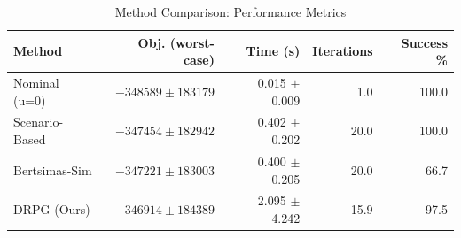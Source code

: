 \begin{table}[t]
\centering
\caption{Method Comparison: Performance Metrics}
\label{tab:method_comparison}
\begin{tabular}{lrrrr}
\toprule
\textbf{Method} & \textbf{Obj. (worst-case)} & \textbf{Time (s)} & \textbf{Iterations} & \textbf{Success \%} \\
\midrule
Nominal (u=0)        & $-348589 \pm 183179$ & 0.015 $\pm$ 0.009 & 1.0 & 100.0 \\
Scenario-Based       & $-347454 \pm 182942$ & 0.402 $\pm$ 0.202 & 20.0 & 100.0 \\
Bertsimas-Sim        & $-347221 \pm 183003$ & 0.400 $\pm$ 0.205 & 20.0 & 66.7 \\
DRPG (Ours)          & $-346914 \pm 184389$ & 2.095 $\pm$ 4.242 & 15.9 & 97.5 \\
\bottomrule
\end{tabular}
\end{table}

